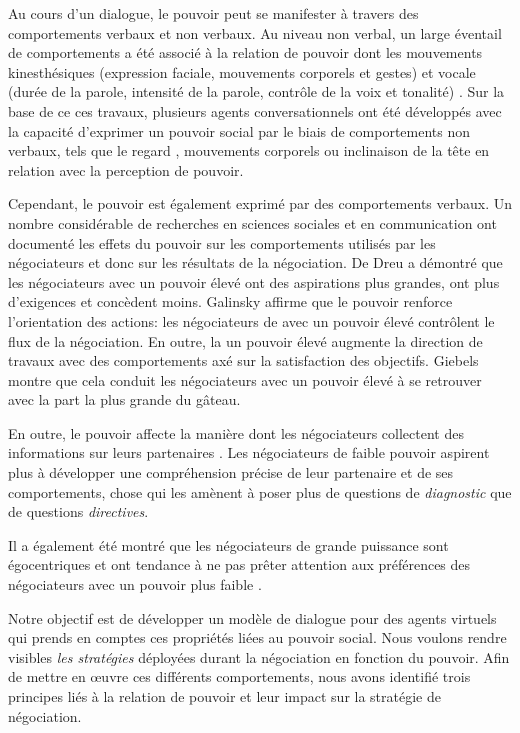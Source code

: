 		Au cours d'un dialogue, le pouvoir peut se manifester à travers des comportements verbaux et non verbaux.
		Au niveau non verbal, un large éventail de comportements a été associé à la relation de pouvoir dont les mouvements kinesthésiques (expression faciale, mouvements corporels et gestes) et vocale (durée de la parole, intensité de la parole, contrôle de la voix et tonalité) \cite {burgoonnonverbal}. Sur la base de ce ces travaux, plusieurs agents conversationnels ont été développés avec la capacité d'exprimer un pouvoir social par le biais de comportements non verbaux, tels que le regard \cite {lance2008relation}, mouvements corporels \cite {mignault2003many} ou inclinaison de la tête  \cite {gebhard2014exploring} en relation avec la perception de pouvoir.
	
	
		Cependant, le pouvoir est également exprimé par des comportements verbaux. Un nombre considérable de recherches en sciences sociales et en communication ont documenté les effets du pouvoir sur les comportements utilisés par les négociateurs et donc sur les résultats de la négociation. De Dreu \cite {de1995impact} a démontré que les négociateurs avec un pouvoir élevé ont des aspirations plus grandes, ont plus d'exigences et concèdent moins. Galinsky \cite{galinsky2003power} affirme que le pouvoir renforce l'orientation des actions: les négociateurs de avec un pouvoir élevé contrôlent le flux de la négociation. En outre, la un pouvoir élevé augmente la direction de travaux avec des comportements axé sur la satisfaction des objectifs. Giebels \cite {giebels2000interdependence} montre que cela conduit les négociateurs avec un pouvoir élevé à se retrouver avec la part la plus grande du gâteau.
		
		En outre, le pouvoir affecte la manière dont les négociateurs collectent des informations sur leurs partenaires \cite {de2004influence}. Les négociateurs de faible pouvoir aspirent plus à développer une compréhension précise de leur partenaire et de ses comportements, chose qui les amènent à poser plus de questions  de \emph {diagnostic} que de questions \emph{directives}.
		
		Il a également été montré que les négociateurs de grande puissance sont égocentriques et ont tendance à ne pas prêter attention aux préférences des négociateurs avec un pouvoir plus faible \cite{fiske1993controlling, de1995impact}.
		
		Notre objectif est de développer un modèle de dialogue pour des agents virtuels qui prends en comptes ces propriétés liées au pouvoir social. Nous voulons rendre visibles \emph {les stratégies} déployées durant la négociation en fonction du pouvoir. Afin de mettre en œuvre ces différents comportements, nous avons identifié trois principes liés à la relation de pouvoir et leur impact sur la stratégie de négociation.
		
